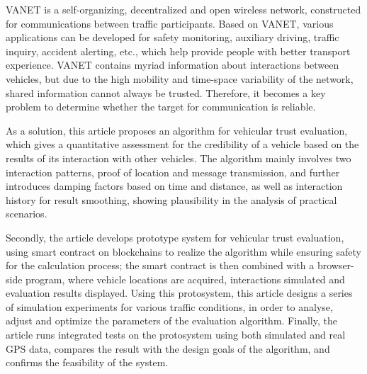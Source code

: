 \begin{abstract*}
VANET is a self-organizing, decentralized and open wireless network, constructed for communications between traffic participants. Based on VANET, various applications can be developed for safety monitoring, auxiliary driving, traffic inquiry, accident alerting, etc., which help provide people with better transport experience. VANET contains myriad information about interactions between vehicles, but due to the high mobility and time-space variability of the network, shared information cannot always be trusted. Therefore, it becomes a key problem to determine whether the target for communication is reliable. 

As a solution, this article proposes an algorithm for vehicular trust evaluation, which gives a quantitative assessment for the credibility of a vehicle based on the results of its interaction with other vehicles. The algorithm mainly involves two interaction patterns, proof of location and message transmission, and further introduces damping factors based on time and distance, as well as interaction history for result smoothing, showing plausibility in the analysis of practical scenarios.

Secondly, the article develops prototype system for vehicular trust evaluation, using smart contract on blockchains to realize the algorithm while ensuring safety for the calculation process; the smart contract is then combined with a browser-side program, where vehicle locations are acquired, interactions simulated and evaluation results displayed. Using this protosystem, this article designs a series of simulation experiments for various traffic conditions, in order to analyse, adjust and optimize the parameters of the evaluation algorithm. Finally, the article runs integrated tests on the protosystem using both simulated and real GPS data, compares the result with the design goals of the algorithm, and confirms the feasibility of the system.

\end{abstract*}
